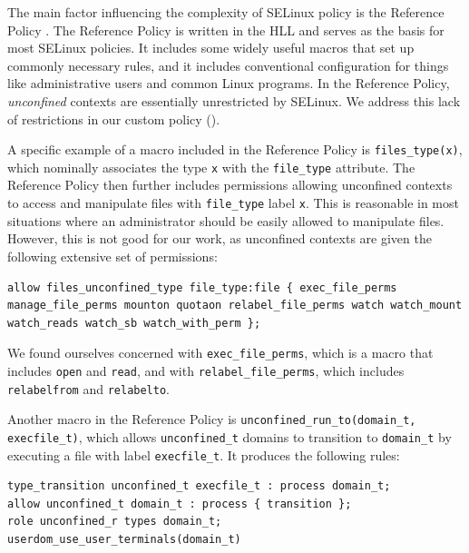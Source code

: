 The main factor influencing the complexity of SELinux policy is the Reference Policy \cite{SELinuxProject:2026:ReferencePolicy}.
The Reference Policy is written in the HLL and serves as the basis for most SELinux policies.
It includes some widely useful macros that set up commonly necessary rules,
and it includes conventional configuration for things like administrative users and common Linux programs.
In the Reference Policy, \emph{unconfined} contexts are essentially unrestricted by SELinux.
We address this lack of restrictions in our custom policy ().

A specific example of a macro included in the Reference Policy is \verb|files_type(x)|, which nominally associates the type \verb|x| with the \verb|file_type| attribute.
The Reference Policy then further includes permissions allowing unconfined contexts to access and manipulate files with \verb|file_type| label \verb|x|.
This is reasonable in most situations where an administrator should be easily allowed to manipulate files.
However, this is not good for our work, as unconfined contexts are given the following extensive set of permissions:
\begin{lstlisting}[style=selinux-policy]
allow files_unconfined_type file_type:file { exec_file_perms manage_file_perms mounton quotaon relabel_file_perms watch watch_mount watch_reads watch_sb watch_with_perm };
\end{lstlisting}
We found ourselves concerned with
\verb|exec_file_perms|, which is a macro that includes \verb|open| and \verb|read|,
and with \verb|relabel_file_perms|, which includes \verb|relabelfrom| and \verb|relabelto|.

Another macro in the Reference Policy is \verb|unconfined_run_to(domain_t, execfile_t)|,
which allows \verb|unconfined_t| domains to transition to \verb|domain_t| by executing a file with label \verb|execfile_t|.
It produces the following rules:
\begin{lstlisting}[style=selinux-policy]
type_transition unconfined_t execfile_t : process domain_t;
allow unconfined_t domain_t : process { transition };
role unconfined_r types domain_t;
userdom_use_user_terminals(domain_t)
\end{lstlisting}

